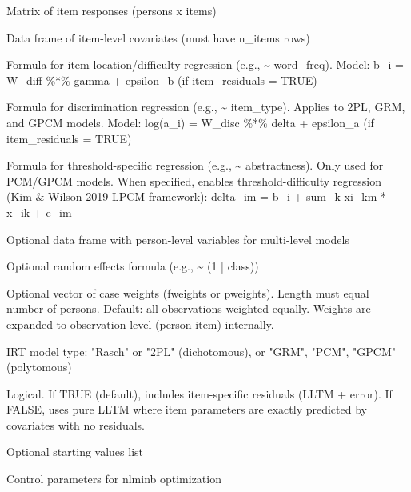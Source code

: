 \documentclass[a4paper]{book}
\begin{document}
\begin{Arguments}
\begin{ldescription}
\item[\code{response\_matrix}] Matrix of item responses (persons x items)

\item[\code{item\_data}] Data frame of item-level covariates (must have n\_items rows)

\item[\code{difficulty\_formula}] Formula for item location/difficulty regression (e.g., \textasciitilde{} word\_freq).
Model: b\_i = W\_diff \%*\% gamma + epsilon\_b (if item\_residuals = TRUE)

\item[\code{discrimination\_formula}] Formula for discrimination regression (e.g., \textasciitilde{} item\_type).
Applies to 2PL, GRM, and GPCM models.
Model: log(a\_i) = W\_disc \%*\% delta + epsilon\_a (if item\_residuals = TRUE)

\item[\code{threshold\_formula}] Formula for threshold-specific regression (e.g., \textasciitilde{} abstractness).
Only used for PCM/GPCM models. When specified, enables threshold-difficulty regression
(Kim \& Wilson 2019 LPCM framework): delta\_im = b\_i + sum\_k xi\_km * x\_ik + e\_im

\item[\code{person\_data}] Optional data frame with person-level variables for multi-level models

\item[\code{random}] Optional random effects formula (e.g., \textasciitilde{} (1 | class))

\item[\code{weights}] Optional vector of case weights (fweights or pweights).
Length must equal number of persons. Default: all observations weighted equally.
Weights are expanded to observation-level (person-item) internally.

\item[\code{model}] IRT model type: "Rasch" or "2PL" (dichotomous), or
"GRM", "PCM", "GPCM" (polytomous)

\item[\code{item\_residuals}] Logical. If TRUE (default), includes item-specific residuals
(LLTM + error). If FALSE, uses pure LLTM where item parameters are exactly
predicted by covariates with no residuals.

\item[\code{start}] Optional starting values list

\item[\code{control}] Control parameters for nlminb optimization
\end{ldescription}
\end{Arguments}
\end{document}
